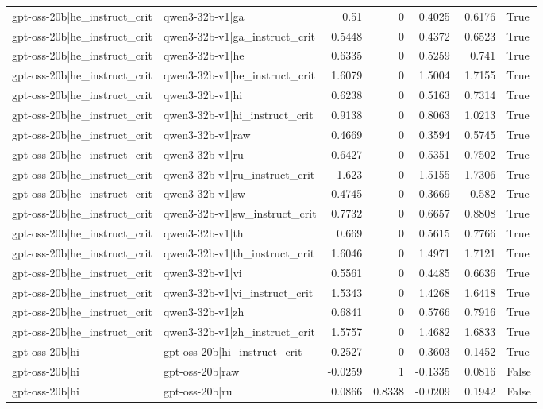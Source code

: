 \begin{table}
\begin{tabular}{l l r r r r l}
gpt-oss-20b|he_instruct_crit & qwen3-32b-v1|ga & 0.51 & 0 & 0.4025 & 0.6176 & True \\
gpt-oss-20b|he_instruct_crit & qwen3-32b-v1|ga_instruct_crit & 0.5448 & 0 & 0.4372 & 0.6523 & True \\
gpt-oss-20b|he_instruct_crit & qwen3-32b-v1|he & 0.6335 & 0 & 0.5259 & 0.741 & True \\
gpt-oss-20b|he_instruct_crit & qwen3-32b-v1|he_instruct_crit & 1.6079 & 0 & 1.5004 & 1.7155 & True \\
gpt-oss-20b|he_instruct_crit & qwen3-32b-v1|hi & 0.6238 & 0 & 0.5163 & 0.7314 & True \\
gpt-oss-20b|he_instruct_crit & qwen3-32b-v1|hi_instruct_crit & 0.9138 & 0 & 0.8063 & 1.0213 & True \\
gpt-oss-20b|he_instruct_crit & qwen3-32b-v1|raw & 0.4669 & 0 & 0.3594 & 0.5745 & True \\
gpt-oss-20b|he_instruct_crit & qwen3-32b-v1|ru & 0.6427 & 0 & 0.5351 & 0.7502 & True \\
gpt-oss-20b|he_instruct_crit & qwen3-32b-v1|ru_instruct_crit & 1.623 & 0 & 1.5155 & 1.7306 & True \\
gpt-oss-20b|he_instruct_crit & qwen3-32b-v1|sw & 0.4745 & 0 & 0.3669 & 0.582 & True \\
gpt-oss-20b|he_instruct_crit & qwen3-32b-v1|sw_instruct_crit & 0.7732 & 0 & 0.6657 & 0.8808 & True \\
gpt-oss-20b|he_instruct_crit & qwen3-32b-v1|th & 0.669 & 0 & 0.5615 & 0.7766 & True \\
gpt-oss-20b|he_instruct_crit & qwen3-32b-v1|th_instruct_crit & 1.6046 & 0 & 1.4971 & 1.7121 & True \\
gpt-oss-20b|he_instruct_crit & qwen3-32b-v1|vi & 0.5561 & 0 & 0.4485 & 0.6636 & True \\
gpt-oss-20b|he_instruct_crit & qwen3-32b-v1|vi_instruct_crit & 1.5343 & 0 & 1.4268 & 1.6418 & True \\
gpt-oss-20b|he_instruct_crit & qwen3-32b-v1|zh & 0.6841 & 0 & 0.5766 & 0.7916 & True \\
gpt-oss-20b|he_instruct_crit & qwen3-32b-v1|zh_instruct_crit & 1.5757 & 0 & 1.4682 & 1.6833 & True \\
gpt-oss-20b|hi & gpt-oss-20b|hi_instruct_crit & -0.2527 & 0 & -0.3603 & -0.1452 & True \\
gpt-oss-20b|hi & gpt-oss-20b|raw & -0.0259 & 1 & -0.1335 & 0.0816 & False \\
gpt-oss-20b|hi & gpt-oss-20b|ru & 0.0866 & 0.8338 & -0.0209 & 0.1942 & False \\

\end{tabular}
\end{table}

